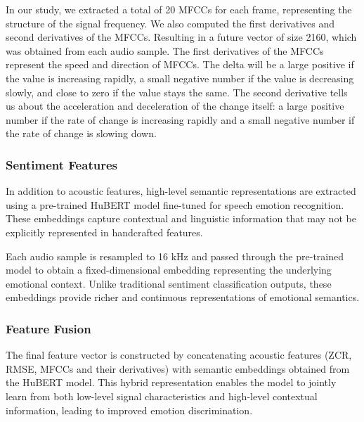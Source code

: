 \documentclass[iicol,sn-mathphys-num]{sn-jnl}%
\theoremstyle{thmstyleone}%
\theoremstyle{thmstyletwo}%
\theoremstyle{thmstylethree}%
\begin{document}
\begin{enumerate}
\begin{itemize}
    \end{itemize}

    In our study, we extracted a total of 20 MFCCs for each frame, representing the structure of the signal frequency. We also computed the first derivatives and second derivatives of the MFCCs. Resulting in a future vector of size 2160, which was obtained from each audio sample. The first derivatives of the MFCCs represent the speed and direction of MFCCs. The delta will be a large positive if the value is increasing rapidly, a small negative number if the value is decreasing slowly, and close to zero if the value stays the same. The second derivative tells us about the acceleration and deceleration of the change itself: a large positive number if the rate of change is increasing rapidly and a small negative number if the rate of change is slowing down. 
 \fi   


\end{enumerate}

\subsubsection{Sentiment Features}\label{subsubsec3.3.2}
In addition to acoustic features, high-level semantic representations are extracted using a pre-trained HuBERT model fine-tuned for speech emotion recognition. These embeddings capture contextual and linguistic information that may not be explicitly represented in handcrafted features.

Each audio sample is resampled to 16 kHz and passed through the pre-trained model to obtain a fixed-dimensional embedding representing the underlying emotional context. Unlike traditional sentiment classification outputs, these embeddings provide richer and continuous representations of emotional semantics.
\subsubsection{Feature Fusion}\label{subsubsec3.3.3}
The final feature vector is constructed by concatenating acoustic features (ZCR, RMSE, MFCCs and their derivatives) with semantic embeddings obtained from the HuBERT model. This hybrid representation enables the model to jointly learn from both low-level signal characteristics and high-level contextual information, leading to improved emotion discrimination.
\end{document}
